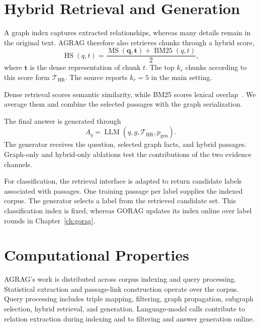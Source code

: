 \section{Hybrid Retrieval and Generation}
\label{sec:agrag:hybrid}
A graph index captures extracted relationships, whereas many details remain in the original text. AGRAG therefore also retrieves chunks through a hybrid score,
\begin{equation}
\operatorname{HS}(q,t)=\frac{\operatorname{MS}(\mathbf{q},\mathbf{t})+
\operatorname{BM25}(q,t)}{2},
\label{eq:agrag:hybrid}
\end{equation}
where $\mathbf{t}$ is the dense representation of chunk $t$. The top $k_r$ chunks according to this score form $\mathcal{T}_{\mathrm{HR}}$. The source reports $k_r=5$ in the main setting.

Dense retrieval scores semantic similarity, while BM25 scores lexical overlap~\cite{agrag-robertson2009probabilistic}. We average them and combine the selected passages with the graph serialization.

The final answer is generated through
\begin{equation}
A_q=\operatorname{LLM}(q,g,\mathcal{T}_{\mathrm{HR}},p_{\mathrm{gen}}).
\label{eq:agrag:generation}
\end{equation}
The generator receives the question, selected graph facts, and hybrid passages. Graph-only and hybrid-only ablations test the contributions of the two evidence channels.

For classification, the retrieval interface is adapted to return candidate labels associated with passages. One training passage per label supplies the indexed corpus. The generator selects a label from the retrieved candidate set. This classification index is fixed, whereas GORAG updates its index online over label rounds in Chapter~\ref{ch:gorag}.

\section{Computational Properties}
\label{sec:agrag:complexity}
AGRAG's work is distributed across corpus indexing and query processing. Statistical extraction and passage-link construction operate over the corpus. Query processing includes triple mapping, filtering, graph propagation, subgraph selection, hybrid retrieval, and generation. Language-model calls contribute to relation extraction during indexing and to filtering and answer generation online.

